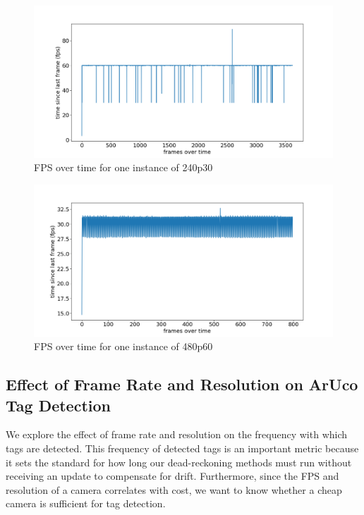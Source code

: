\documentclass{article}
\begin{document}
    \begin{figure}[H]
      \centering
      \includegraphics[width=0.8\linewidth]{./images/fps_plot_2.png}
      \caption{FPS over time for one instance of 240p30}
      \label{fig:fps_plot_2}
    \end{figure}

    \begin{figure}[H]
      \centering
      \includegraphics[width=0.8\linewidth]{./images/fps_plot_1.png}
      \caption{FPS over time for one instance of  480p60}
      \label{fig:fps_plot_1}
    \end{figure}

  \subsection{Effect of Frame Rate and Resolution on ArUco Tag Detection} \label{section:fps}

    We explore the effect of frame rate and resolution on the frequency with which tags are detected. This frequency of detected tags is an important metric because it sets the standard for how long our dead-reckoning methods must run without receiving an update to compensate for drift. Furthermore, since the FPS and resolution of a camera correlates with cost, we want to know whether a cheap camera is sufficient for tag detection.
\end{document}
